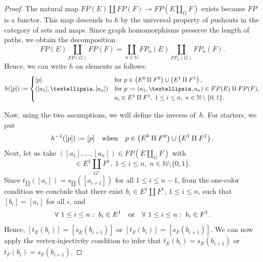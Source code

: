 \documentclass[10pt,a4paper]{amsart}
\def\text{\hbox}
\begin{document}
\begin{proof}
The natural map $FP(E)\amalg FP(F)\rightarrow FP(E\amalg_GF)$ exists because $FP$ is a functor. 
This map descends to $h$ by the universal
property of pushouts in the category of sets and maps. Since graph homomorphisms preserve the length
of paths, we obtain the decomposition
\begin{equation}
FP(E)\underset{FP(G)}{\amalg}FP(F)=\coprod_{n\in\mathbb{N}} FP_n(E)\underset{FP_n(G)}{\amalg}FP_n(F).
\end{equation}
Hence,  we can write $h$ on elements as follows:
\begin{equation}
h([p]):=\begin{cases}
[p] &\text{for } p\in \left(E^0\amalg F^0\right)\cup \left(E^1\amalg F^1\right),\\
([a_1],\ldots,[a_n]) &\text{for } p:=(a_1,\ldots,a_n)\in FP(E)\amalg FP(F),\\
&a_i\in E^1\amalg F^1,\;1\leq i\leq n,\;n\in\mathbb{N}\setminus\{0,1\}.
\end{cases}
\end{equation}

Now, using the two assumptions, we will define the inverse of~$h$. For starters, we put 
\begin{equation}\label{zeroone}
h^{-1}([p]):=[p]\quad
\text{when}\quad p\in \left(E^0\amalg F^0\right)\cup \left(E^1\amalg F^1\right).
\end{equation}
Next, let us take $([a_1],\ldots,[a_n])\in FP(E\amalg_GF)$
 with 
\begin{equation}
[a_i]\in E^1\underset{G^1}{\amalg}F^1,\; 1\leq i\leq n,\;
 n\in\mathbb{N}\setminus\{0,1\}. 
\end{equation}
Since $t_\amalg([a_i])=s_\amalg([a_{i+1}])$ for all $1\leq i\leq n-1$,
from the one-color condition we conclude that there exist $b_i\in E^1\amalg F^1$, $1\leq i\leq n$, such that $[b_i]=[a_i]$ for all $i$, and
\begin{equation}
\forall~1\leq i\leq n:~b_i\in E^1\quad\text{or}\quad\forall~1\leq i\leq n:~b_i\in F^1.
\end{equation}
Hence, $[t_E(b_i)]=[s_E(b_{i+1})]$ or $[t_F(b_i)]=[s_F(b_{i+1})]$. We can now apply the vertex-injectivity condition to infer that
$t_E(b_i)=s_E(b_{i+1})$ or $t_F(b_i)=s_F(b_{i+1})$. 


\end{proof}
\end{document}
